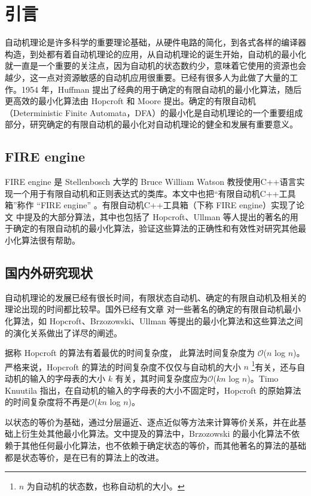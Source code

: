 \chapter{引言}
自动机理论是许多科学的重要理论基础，从硬件电路的简化，到各式各样的编译器构造，到处都有着自动机理论的应用，从自动机理论的诞生开始，自动机的最小化就一直是一个重要的关注点，因为自动机的状态数约少，意味着它使用的资源也会越少，这一点对资源敏感的自动机应用很重要。已经有很多人为此做了大量的工作。1954 年，Huffman 提出了经典的用于确定的有限自动机的最小化算法\cite{HUFFMAN1954161}，随后更高效的最小化算法由 Hopcroft 和 Moore 提出。确定的有限自动机（Deterministic Finite Automata，DFA）的最小化是自动机理论的一个重要组成部分，研究确定的有限自动机的最小化对自动机理论的健全和发展有重要意义。

\section{FIRE engine}
FIRE engine \cite{watson1994design}是 Stellenbosch 大学的 Bruce William Watson 教授使用C++语言实现一个用于有限自动机和正则表达式的类库。本文中也把“有限自动机C++工具箱”称作 “FIRE engine” 。有限自动机C++工具箱（下称 FIRE engine）实现了论文 \cite{watson1993taxonomya,watson1993taxonomyb} 中提及的大部分算法，其中也包括了 Hopcroft、Ullman 等人提出的著名的用于确定的有限自动机的最小化算法，验证这些算法的正确性和有效性对研究其他最小化算法很有帮助。

\section{国内外研究现状}

自动机理论的发展已经有很长时间，有限状态自动机、确定的有限自动机及相关的理论出现的时间都比较早。国外已经有文章 \cite{watson1993taxonomyb} 对一些著名的确定的有限自动机最小化算法，如 Hopcroft、Brzozowski、Ullman 等提出的最小化算法和这些算法之间的演化关系做出了详尽的阐述。

据称 Hopcroft 的算法有着最优的时间复杂度， 此算法时间复杂度为 $\mathcal{O}$($n$ log $n$)\cite{Hopc71}。严格来说，Hopcroft 的算法的时间复杂度不仅仅与自动机的大小 $n$ \footnote{ $n$ 为自动机的状态数，也称自动机的大小。}有关，还与自动机的输入的字母表的大小 $k$ 有关，其时间复杂度应为$\mathcal{O}$($kn$ log $n$)。Timo Knuutila 指出，在自动机的输入的字母表的大小不固定时，Hopcroft 的原始算法的时间复杂度将不再是$\mathcal{O}$($kn$ log $n$)\cite{KNUUTILA2001333}。

以状态的等价为基础，通过分层逼近、逐点近似等方法来计算等价关系，并在此基础上衍生处其他最小化算法。文中提及的算法中，Brzozowski 的最小化算法不依赖于其他任何最小化算法，也不依赖于确定状态的等价，而其他著名的算法的基础都是状态等价，是在已有的算法上的改进\cite{watson1993taxonomyb}。

